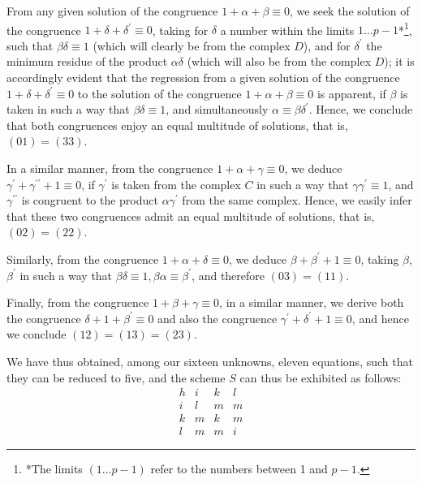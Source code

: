 \documentclass[twoside,12pt, showframe]{memoir}
\begin{document}
From any given solution of the congruence \(1+\alpha+\beta \equiv 0\), we seek the solution of the congruence \(1+\delta+\delta^{\prime} \equiv 0\), taking for \(\delta\) a number within the limits \(1 \ldots p-1\)*\footnote{*The limits \((1\ldots p-1)\) refer to the numbers between 1 and \(p-1\).}, such that \(\beta \delta \equiv 1\) (which will clearly be from the complex \(D\)), and for \(\delta^{\prime}\) the minimum residue of the product \(\alpha \delta\) (which will also be from the complex \(D\)); it is accordingly evident that the regression from a given solution of the congruence \(1+\delta+\delta^{\prime} \equiv 0\) to the solution of the congruence \(1+\alpha+\beta \equiv 0\) is apparent, if \(\beta\) is taken in such a way that \(\beta \delta \equiv 1\), and simultaneously \(\alpha \equiv \beta \delta^{\prime}\). Hence, we conclude that both congruences enjoy an equal multitude of solutions, that is, \((01) = (33)\).

In a similar manner, from the congruence \(1+\alpha+\gamma \equiv 0\), we deduce \(\gamma^{\prime}+\gamma^{\prime \prime}+1 \equiv 0\), if \(\gamma^{\prime}\) is taken from the complex \(C\) in such a way that \(\gamma \gamma^{\prime} \equiv 1\), and \(\gamma^{\prime \prime}\) is congruent to the product \(\alpha \gamma^{\prime}\) from the same complex. Hence, we easily infer that these two congruences admit an equal multitude of solutions, that is, \((02) = (22)\).

Similarly, from the congruence \(1+\alpha+\delta \equiv 0\), we deduce \(\beta+\beta^{\prime}+1 \equiv 0\), taking \(\beta\), \(\beta^{\prime}\) in such a way that \(\beta \delta \equiv 1, \beta \alpha \equiv \beta^{\prime}\), and therefore \((03) = (11)\).

Finally, from the congruence \(1+\beta+\gamma \equiv 0\), in a similar manner, we derive both the congruence \(\delta+1+\beta^{\prime} \equiv 0\) and also the congruence \(\gamma^{\prime}+\delta^{\prime}+1 \equiv 0\), and hence we conclude \((12) = (13) = (23)\).

We have thus obtained, among our sixteen unknowns, eleven equations, such that they can be reduced to five, and the scheme \(S\) can thus be exhibited as follows:
\[
\begin{array}{llll}
h & i & k & l \\
i & l & m & m \\
k & m & k & m \\
l & m & m & i
\end{array}
\]
%
\end{document}
